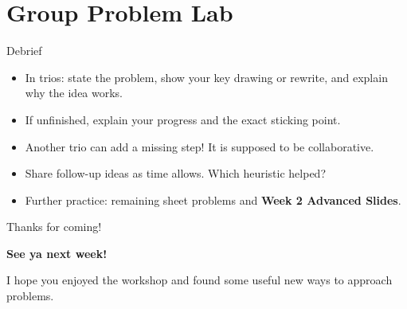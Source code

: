 \documentclass{beamer}
\begin{document}
\section{Group Problem Lab}

\begin{frame}{Debrief}
    \begin{itemize}[<1->]
        \item In trios: state the problem, show your key
            drawing or rewrite, and explain why the idea works.
        \item If unfinished, explain your progress and the exact sticking point.
        \item Another trio can add a missing step! It is supposed to be collaborative.
        \item Share follow-up ideas as time allows. Which heuristic helped?
        \item Further practice: remaining sheet problems and
            \textbf{Week 2 Advanced Slides}.
    \end{itemize}
\end{frame}

\begin{frame}{Thanks for coming!}
    \begin{center}
        \Large
        \textbf{See ya next week!}

        I hope you enjoyed the workshop and found some useful new
        ways to approach problems.
    \end{center}
\end{frame}
\end{document}
